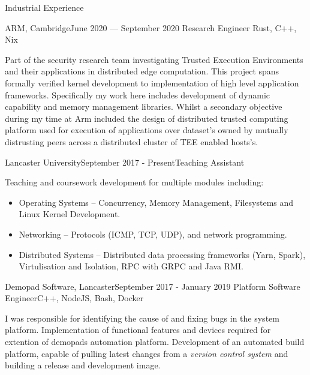\documentclass{resume} %
\begin{document}
\begin{rSection}{Industrial Experience}
	

	\begin{rSubsection} {ARM, Cambridge}{June 2020 --- September 2020} {Research Engineer} {Rust, C++, Nix}
	\item[] Part of the security research team investigating Trusted Execution Environments and their applications in distributed edge computation. This project spans formally verified kernel development to implementation of high level application frameworks. 	
	Specifically my work here includes development of dynamic capability and memory management libraries. Whilst a secondary objective during my time at Arm included the design of distributed trusted computing platform used for execution of applications over dataset's owned by mutually distrusting peers across a distributed cluster of TEE enabled hosts's.
	\end{rSubsection}
	
	\begin{rSubsection}{Lancaster University}{September 2017 - Present}{Teaching Assistant}{}
		\item [] Teaching and coursework development for multiple modules including:
			\begin{itemize}[noitemsep]
			\item Operating Systems -- Concurrency, Memory Management, Filesystems and Linux Kernel Development.
			\item Networking --  Protocols (ICMP, TCP, UDP), and network programming. 
			\item Distributed Systems -- Distributed data processing frameworks (Yarn, Spark), Virtulisation and Isolation, RPC with GRPC and Java RMI.
		\end{itemize}
	\end{rSubsection}

	\begin{rSubsection}{Demopad Software, Lancaster}{September 2017 - January 2019} {Platform Software Engineer}{C++, NodeJS, Bash, Docker}
		\item [] I was responsible for identifying the cause of and fixing bugs in the system platform. Implementation of functional features and devices required for extention of demopads automation platform. Development of an automated build platform, capable of pulling latest changes from a \textit{version control system} and building a release and development image.
	\end{rSubsection}
	

\end{rSection}
\end{document}
